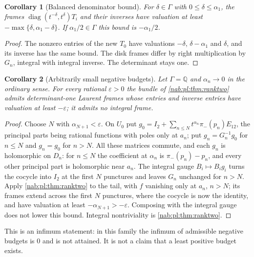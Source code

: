 \documentclass[11pt,letterpaper]{article}
\newtheorem{corollary}[corollary]{Corollary}
\theoremstyle{definition}
\theoremstyle{remark}
\newcommand{\Q}{\mathbb Q}
\numberwithin{equation}{section}
\begin{document}
\begin{corollary}[Balanced denominator bound]\label{nab:pl:cor:balanced}
For $\delta\in\Gamma$ with $0\leq\delta\leq\alpha_1$, the frames
$\operatorname{diag}(t^{-\delta},t^\delta)T_i$ and their inverses have
valuation at least $-\max\{\delta,\alpha_1-\delta\}$. If $\alpha_1/2\in\Gamma$
this bound is $-\alpha_1/2$.
\end{corollary}

\begin{proof}
The nonzero entries of the new $T_0$ have valuations $-\delta$,
$\delta-\alpha_1$ and $\delta$, and its inverse has the same bound. The disk
frames differ by right multiplication by $G_n$, integral with integral inverse.
The determinant stays one.
\end{proof}

\begin{corollary}[Arbitrarily small negative budgets]\label{nab:pl:cor:smallbudget}
Let $\Gamma=\Q$ and $\alpha_n\to0$ in the ordinary sense. For every rational
$\varepsilon>0$ the bundle of \cref{nab:pl:thm:ranktwo} admits determinant-one
Laurent frames whose entries and inverse entries have valuation at least
$-\varepsilon$; it admits no integral frame.
\end{corollary}

\begin{proof}
Choose $N$ with $\alpha_{N+1}<\varepsilon$. On $U_0$ put
$g_0=I_2+\sum_{n\leq N}t^{\alpha_n}\pi_-(p_n)E_{12}$, the principal parts
being rational functions with poles only at $a_n$; put $g_n=G_n^{-1}g_0$ for
$n\leq N$ and $g_n=g_0$ for $n>N$. All these matrices commute, and each $g_n$
is holomorphic on $D_n$: for $n\leq N$ the coefficient at $\alpha_n$ is
$\pi_-(p_n)-p_n$, and every other principal part is holomorphic near $a_n$.
The integral gauge $B_i\mapsto B_ig_i$ turns the cocycle into $I_2$ at the
first $N$ punctures and leaves $G_n$ unchanged for $n>N$. Apply
\cref{nab:pl:thm:ranktwo} to the tail, with $f$ vanishing only at $a_n$,
$n>N$; its frames extend across the first $N$ punctures, where the cocycle is
now the identity, and have valuation at least $-\alpha_{N+1}>-\varepsilon$.
Composing with the integral gauge does not lower this bound. Integral
nontriviality is \cref{nab:pl:thm:ranktwo}.
\end{proof}

This is an infimum statement: in this family the infimum of admissible
negative budgets is $0$ and is not attained. It is not a claim that a least
positive budget exists.
\end{document}
